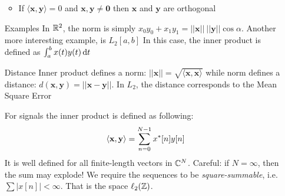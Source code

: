 \documentclass[11pt,a4paper]{article}
\begin{document}
\begin{itemize}
\begin{multicols}{2}
\begin{itemize}
            \item If $\langle\mathbf{x},\mathbf{y}\rangle = 0$ and $\mathbf{x,y} \neq \mathbf{0}$ then $\mathbf{x}$ and $\mathbf{y}$ are orthogonal
        \end{itemize}
    \end{multicols}
    \item[Examples] In $\R^2$, the norm is simply $x_0y_0 + x_1y_1 = ||\mathbf{x}||\ ||\mathbf{y}|| \cos\alpha$. Another more interesting example, is $L_2[a,b]$ In this case, the inner product is defined as $\int_a^b x(t)y(t)\deriv{t}$
    \item[Distance]Inner product defines a norm: $||\mathbf{x}|| = \sqrt{\langle\mathbf{x},\mathbf{x}\rangle}$ while norm defines a distance: $d(\mathbf{x},\mathbf{y}) = ||\mathbf{x}- \mathbf{y}||$. In $L_2$, the distance corresponds to the Mean Square Error
    \item[For signals] the inner product is defined as following:
    \begin{equation}
        \langle\mathbf{x},\mathbf{y}\rangle = \somme{N-1}{n=0}x^*[n]y[n]
    \end{equation}
    It is well defined for all finite-length vectors in $\C^N$. Careful: if $N = \infty$, then the sum may explode! We require the sequences to be \textit{square-summable}, i.e. $\sum|x[n]| < \infty$. That is the space $\ell_2(\Z)$.
\end{itemize}
\end{document}
